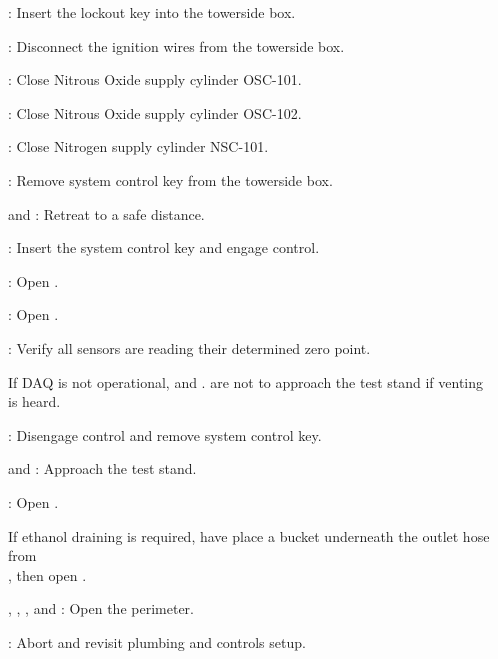 \begin{checklist}
    \item \secondary{}: Insert the lockout key into the towerside box.
    \item \secondary{}: Disconnect the ignition wires from the towerside box. 
    \item \primary{}: Close Nitrous Oxide supply cylinder OSC-101. 
    \item \primary{}: Close Nitrous Oxide supply cylinder OSC-102. 
    \item \primary{}: Close Nitrogen supply cylinder NSC-101. 
    \item \secondary{}: Remove system control key from the towerside box.
    \item \primary{} and \secondary{}: Retreat to a safe distance. 
    \item \rlcs{}: Insert the system control key and engage control. 
    \item \rlcs{}: Open \oxfill{}.
    \item \rlcs{}: Open \purge{}. 
    \item \daq{}: Verify all sensors are reading their determined zero point.
        \begin{checklist}[label=$\bullet$]
            \item If DAQ is not operational,\primary{} and \secondary{}. are not to approach the test stand if venting \\ \phantom{} \hspace{7ex} is heard.
    \end{checklist}
    \item \rlcs{}: Disengage control and remove system control key. 
    \item \primary{} and \secondary{}: Approach the test stand. 
    \item \primary{}: Open \pdrain{}. 
    \begin{checklist}[label=$\bullet$]
            \item If ethanol draining is required, have \primary{} place a bucket underneath the outlet hose from \\ \phantom{} \hspace{7ex} \fdrain{}, then open \fdrain{}. 
    \end{checklist}
    \item \peri{}, \perii{}, \periii{}, and \periv{}: Open the perimeter. 
    \item \ops{}: Abort and revisit plumbing and controls setup. 
\end{checklist}

